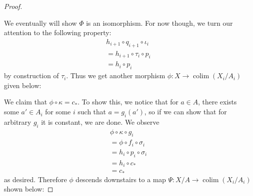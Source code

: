 \documentclass{article}
\DeclareMathOperator{\colim}{\mathrm{colim}}
\begin{document}
\begin{proof}
    \begin{center}
    \end{center}
    We eventually will show $\Phi$ is an isomorphism. For now though, we turn our attention to the following property:
    \begin{align*}
        h_{i+1}\circ q_{i+1} \circ \iota_i\\
        =h_{i+1}\circ \tau_i \circ p_i\\
        =h_i\circ p_i
    \end{align*}
    by construction of $\tau_i$. Thus we get another morphism $\phi:X\to \colim (X_i/A_i)$ given below:
    \begin{center}
    \end{center}
    We claim that $\phi \circ \kappa=c_*$. To show this, we notice that for $a\in A$, there exists some $a'\in A_i$ for some $i$ such that $a=g_i(a')$, so if we can show that for arbitrary $g_i$ it is constant, we are done. We observe
    \begin{align*}
        \phi \circ \kappa \circ g_i\\
        = \phi \circ f_i\circ \sigma_i\\
        =h_i\circ p_i\circ \sigma_i\\
        =h_i\circ c_*\\
        =c_*
    \end{align*}
    as desired. Therefore $\phi$ descends downstairs to a map $\Psi:X/A\to \colim(X_i/A_i)$ shown below:

\end{proof}
\end{document}
